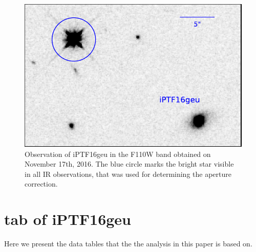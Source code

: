 \documentclass[a4paper,fleqn,usenatbib]{mnras}
\newcommand{\geu}{iPTF16geu\xspace}
\newcommand{\sn}{SN\xspace}
\begin{document}
\begin{figure}
\centering
\includegraphics[width=\columnwidth]{psf_ir_star.pdf}
\caption{%
	Observation of \geu in the F110W band obtained on November 17th, 2016.  The blue circle marks the bright star visible in
	all IR observations, that was used for determining the aperture correction.
	\label{fig:psfnir}
}
\end{figure}


\section{tab of \geu}
Here we present the data tables that the the analysis in this paper is based on.

\begin{landscape}
\begin{table}
	\centering
	\caption{%
		Derived photometry for the four lensed \sn images.  The first error quoted for each measurement is the statistical
		uncertainty that is expected to uncorrelated between epochs.  This includes the expected PSF variations discussed
		in \S\ref{sec:wfcpsf}.  The second error, is the systematic error from the background model fit discussed in the text.
		This is will be correlated for measurements obtained with the same filter.
	\label{tb:resolvflux}}
	
\end{table}
\end{landscape}



\bsp	%
\label{lastpage}
\end{document}
